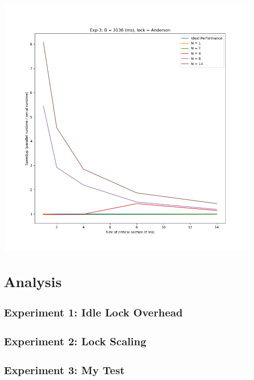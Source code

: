 \documentclass[]{article}
\begin{document}
\includegraphics[scale=0.5]{graphs/exp3_a.png}\\

\section{Analysis}

\subsection{Experiment 1: Idle Lock Overhead}

\subsection{Experiment 2: Lock Scaling}

\subsection{Experiment 3: My Test}
\end{document}

